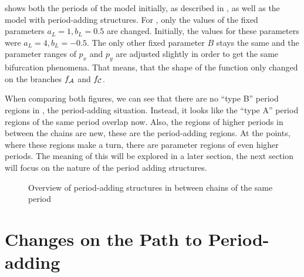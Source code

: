 
 shows both the periods of the model initially, as described in , as well as the model with period-adding structures.
For , only the values of the fixed parameters $a_L = 1, b_L = 0.5$ are changed.
Initially, the values for these parameters were $a_L = 4, b_L = -0.5$.
The only other fixed parameter $B$ stays the same and the parameter ranges of $p_x$ and $p_y$ are adjusted slightly in order to get the same bifurcation phenomena.
That means, that the shape of the function only changed on the branches $f_{\mathcal{A}}$ and $f_{\mathcal{C}}$.

When comparing both figures, we can see that there are no ``type B'' period regions in , the period-adding situation.
Instead, it looks like the ``type A'' period regions of the same period overlap now.
Also, the regions of higher periods in between the chains are new, these are the period-adding regions.
At the points, where these regions make a turn, there are parameter regions of even higher periods.
The meaning of this will be explored in a later section, the next section will focus on the nature of the period adding structures.

\begin{figure}
    \centering
    \caption{Overview of period-adding structures in between chains of the same period}
    \label{fig:minrep.adding1.overview}
\end{figure}

\section{Changes on the Path to Period-adding}

